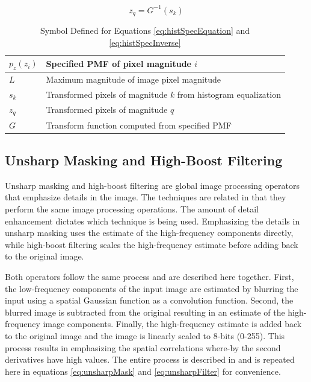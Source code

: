 \documentclass[journal]{IEEEtran}
\begin{document}
\begin{equation} \label{eq:histSpecInverse}
z_q = G^{-1}(s_k)
\end{equation}

\begin{table}[h]
 \centering
 \begin{tabular}{|l|l|}
  \hline
  \(p_z(z_i)\) & Specified PMF of pixel magnitude \(i\) \\ \hline
  \(L\) & Maximum magnitude of image pixel magnitude \\ \hline
  \(s_k\) & Transformed pixels of magnitude \(k\) from histogram equalization \\ \hline
  \(z_q\) & Transformed pixels of magnitude \(q\) \\ \hline
  \(G\) & Transform function computed from specified PMF \\ \hline
 \end{tabular}
 \caption{Symbol Defined for Equations \ref{eq:histSpecEquation} and \ref{eq:histSpecInverse}}
 \label{tab:histSpecTable}
\end{table}

\subsection{Unsharp Masking and High-Boost Filtering}
Unsharp masking and high-boost filtering are global image processing operators that emphasize details in the image. The techniques are related in that they perform the same image processing operations. The amount of detail enhancement dictates which technique is being used. Emphasizing the details in unsharp masking uses the estimate of the high-frequency components directly, while high-boost filtering scales the high-frequency estimate before adding back to the original image.
\par Both operators follow the same process and are described here together. First, the low-frequency components of the input image are estimated by blurring the input using a spatial Gaussian function as a convolution function. Second, the blurred image is subtracted from the original resulting in an estimate of the high-frequency image components. Finally, the high-frequency estimate is added back to the original image and the image is linearly scaled to 8-bits (0-255). This process results in emphasizing the spatial correlations where-by the second derivatives have high values. The entire process is described in \cite[p.~162-165]{Gonzalez} and is repeated here in equations \ref{eq:unsharpMask} and \ref{eq:unsharpFilter} for convenience.
\end{document}
